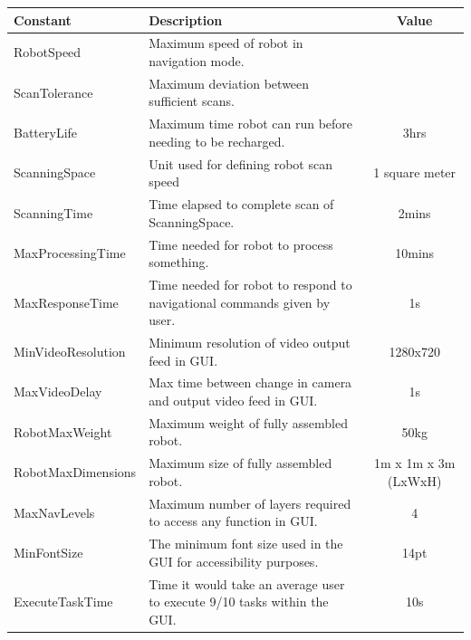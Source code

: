 \documentclass[12pt]{article}
\newcommand{\BatteryLife}{3hrs}
\newcommand{\ScanningSpace}{1 square meter}
\newcommand{\ScanningTime}{2mins}
\newcommand{\MaxProcessingTime}{10mins}
\newcommand{\MaxResponseTime}{1s}
\newcommand{\MinVideoResolution}{1280x720}
\newcommand{\MaxVideoDelay}{1s}
\newcommand{\RobotMaxWeight}{50kg}
\newcommand{\RobotMaxDimensions}{1m x 1m x 3m (LxWxH)}
\newcommand{\MaxNavLevels}{4}
\newcommand{\MinFontSize}{14pt}
\newcommand{\ExecuteTaskTime}{10s}
\begin{document}



\begin{tabular}{ | l | p{8cm} | c |}
  \hline
  \textbf{Constant} & \textbf{Description} & \textbf{Value} \\
  \hline
  RobotSpeed & Maximum speed of robot in navigation mode. & \RobotSpeed{} \\
  \hline
  ScanTolerance & Maximum deviation between sufficient scans. & \ScanTolerance{} \\
  \hline
  BatteryLife & Maximum time robot can run before needing to be recharged. & \BatteryLife{} \\
  \hline
  ScanningSpace & Unit used for defining robot scan speed & \ScanningSpace{} \\
  \hline
  ScanningTime & Time elapsed to complete scan of ScanningSpace. & \ScanningTime{} \\
  \hline
  MaxProcessingTime & Time needed for robot to process something. & \MaxProcessingTime{} \\
  \hline
  MaxResponseTime & Time needed for robot to respond to navigational commands given by user. & \MaxResponseTime{} \\
  \hline
  MinVideoResolution & Minimum resolution of video output feed in GUI. & \MinVideoResolution{} \\
  \hline
  MaxVideoDelay & Max time between change in camera and output video feed in GUI. & \MaxVideoDelay{} \\
  \hline
  RobotMaxWeight & Maximum weight of fully assembled robot. & \RobotMaxWeight{} \\
  \hline
  RobotMaxDimensions & Maximum size of fully assembled robot. & \RobotMaxDimensions{} \\
  \hline
  MaxNavLevels & Maximum number of layers required to access any function in GUI. & \MaxNavLevels{} \\
  \hline
  MinFontSize & The minimum font size used in the GUI for accessibility purposes. & \MinFontSize{} \\
  \hline
  ExecuteTaskTime & Time it would take an average user to execute 9/10 tasks within the GUI. & \ExecuteTaskTime{} \\
  \hline
  
\end{tabular}
\end{document}

